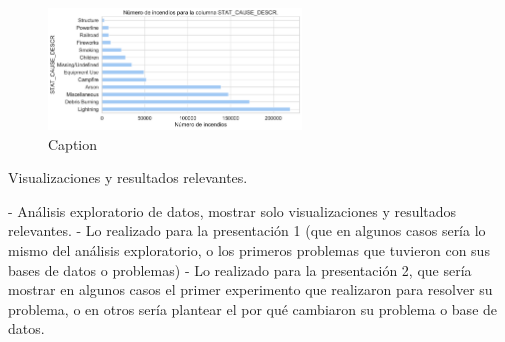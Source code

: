 \begin{figure}
    \centering
    \includegraphics[width=0.6\textwidth]{imagenes/barh_STAT_CAUSE_DESCR.pdf}
    \caption{Caption}
    \label{fig:my_label}
\end{figure}

Visualizaciones y resultados relevantes.

- Análisis exploratorio de datos, mostrar solo visualizaciones y resultados relevantes.
- Lo realizado para la presentación 1 (que en algunos casos sería lo mismo del análisis exploratorio, o los primeros problemas que tuvieron con sus bases de datos o problemas)
- Lo realizado para la presentación 2, que sería mostrar en algunos casos el primer experimento que realizaron para resolver su problema, o en otros sería plantear el por qué cambiaron su problema o base de datos.